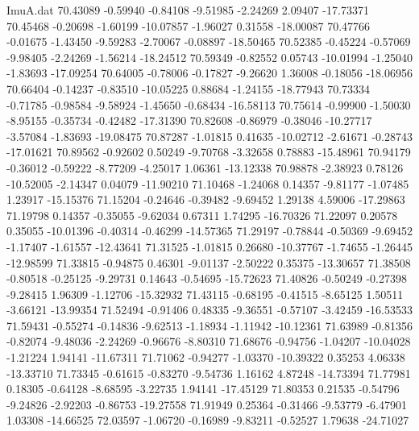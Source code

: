 \begin{filecontents}{ImuA.dat}
  70.43089   -0.59940   -0.84108   -9.51985   -2.24269    2.09407  -17.73371
  70.45468   -0.20698   -1.60199  -10.07857   -1.96027    0.31558  -18.00087
  70.47766   -0.01675   -1.43450   -9.59283   -2.70067   -0.08897  -18.50465
  70.52385   -0.45224   -0.57069   -9.98405   -2.24269   -1.56214  -18.24512
  70.59349   -0.82552    0.05743  -10.01994   -1.25040   -1.83693  -17.09254
  70.64005   -0.78006   -0.17827   -9.26620    1.36008   -0.18056  -18.06956
  70.66404   -0.14237   -0.83510  -10.05225    0.88684   -1.24155  -18.77943
  70.73334   -0.71785   -0.98584   -9.58924   -1.45650   -0.68434  -16.58113
  70.75614   -0.99900   -1.50030   -8.95155   -0.35734   -0.42482  -17.31390
  70.82608   -0.86979   -0.38046  -10.27717   -3.57084   -1.83693  -19.08475
  70.87287   -1.01815    0.41635  -10.02712   -2.61671   -0.28743  -17.01621
  70.89562   -0.92602    0.50249   -9.70768   -3.32658    0.78883  -15.48961
  70.94179   -0.36012   -0.59222   -8.77209   -4.25017    1.06361  -13.12338
  70.98878   -2.38923    0.78126  -10.52005   -2.14347    0.04079  -11.90210
  71.10468   -1.24068    0.14357   -9.81177   -1.07485    1.23917  -15.15376
  71.15204   -0.24646   -0.39482   -9.69452    1.29138    4.59006  -17.29863
  71.19798    0.14357   -0.35055   -9.62034    0.67311    1.74295  -16.70326
  71.22097    0.20578    0.35055  -10.01396   -0.40314   -0.46299  -14.57365
  71.29197   -0.78844   -0.50369   -9.69452   -1.17407   -1.61557  -12.43641
  71.31525   -1.01815    0.26680  -10.37767   -1.74655   -1.26445  -12.98599
  71.33815   -0.94875    0.46301   -9.01137   -2.50222    0.35375  -13.30657
  71.38508   -0.80518   -0.25125   -9.29731    0.14643   -0.54695  -15.72623
  71.40826   -0.50249   -0.27398   -9.28415    1.96309   -1.12706  -15.32932
  71.43115   -0.68195   -0.41515   -8.65125    1.50511   -3.66121  -13.99354
  71.52494   -0.91406    0.48335   -9.36551   -0.57107   -3.42459  -16.53533
  71.59431   -0.55274   -0.14836   -9.62513   -1.18934   -1.11942  -10.12361
  71.63989   -0.81356   -0.82074   -9.48036   -2.24269   -0.96676   -8.80310
  71.68676   -0.94756   -1.04207  -10.04028   -1.21224    1.94141  -11.67311
  71.71062   -0.94277   -1.03370  -10.39322    0.35253    4.06338  -13.33710
  71.73345   -0.61615   -0.83270   -9.54736    1.16162    4.87248  -14.73394
  71.77981    0.18305   -0.64128   -8.68595   -3.22735    1.94141  -17.45129
  71.80353    0.21535   -0.54796   -9.24826   -2.92203   -0.86753  -19.27558
  71.91949    0.25364   -0.31466   -9.53779   -6.47901    1.03308  -14.66525
  72.03597   -1.06720   -0.16989   -9.83211   -0.52527    1.79638  -24.71027

\end{filecontents}
